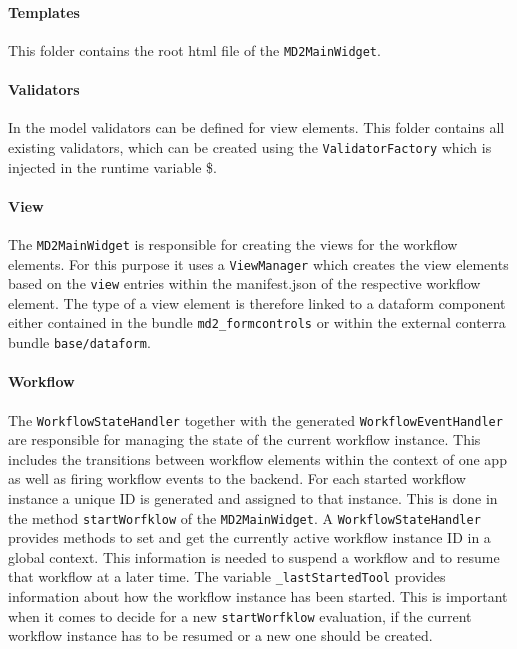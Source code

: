 \paragraph{Templates}
This folder contains the root html file of the \lstinline|MD2MainWidget|.

\paragraph{Validators}
In the model validators can be defined for view elements. This folder contains all existing validators, which can be created using the \lstinline|ValidatorFactory| which is injected in the runtime variable \$.

\paragraph{View}
The \lstinline|MD2MainWidget| is responsible for creating the views for the workflow elements. For this purpose it uses a \lstinline|ViewManager| which creates the view elements based on the \lstinline|view| entries within the manifest.json of the respective workflow element. The type of a view element is therefore linked to a dataform component either contained in the bundle \lstinline|md2_formcontrols| or within the external conterra bundle \lstinline|base/dataform|.

\paragraph{Workflow}\label{par:workflowStateHandler}
The \lstinline|WorkflowStateHandler| together with the generated \lstinline|WorkflowEventHandler| are responsible for managing the state of the current workflow instance. This includes the transitions between workflow elements within the context of one app as well as firing workflow events to the backend.  
For each started workflow instance a unique ID is generated and assigned to that instance. This is done in the method \lstinline!startWorfklow! of the \lstinline!MD2MainWidget!. A \lstinline!WorkflowStateHandler! provides methods to set and get the currently active workflow instance ID in a global context. This information is needed to suspend a workflow and to resume that workflow at a later time. The variable \lstinline|_lastStartedTool| provides information about how the workflow instance has been started. This is important when it comes to decide for a new \lstinline!startWorfklow! evaluation, if the current workflow instance has to be resumed or a new one should be created.

